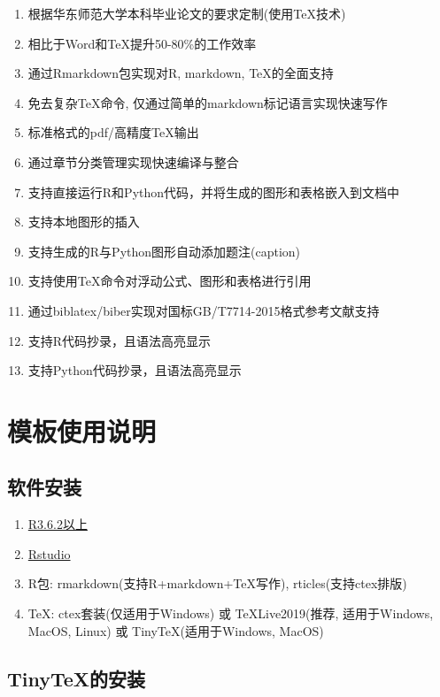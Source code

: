 \documentclass[12pt,a4paper,zihao=-4,UTF8]{book}
\begin{document}
\begin{enumerate}
\def\labelenumi{\arabic{enumi}.}
\item
  根据华东师范大学本科毕业论文的要求定制(使用\TeX 技术)
\item
  相比于Word和\TeX 提升50-80\%的工作效率
\item
  通过Rmarkdown包实现对R, markdown, \TeX 的全面支持
\item
  免去复杂\TeX 命令, 仅通过简单的markdown标记语言实现快速写作
\item
  标准格式的pdf/高精度\TeX 输出
\item
  通过章节分类管理实现快速编译与整合
\item
  支持直接运行R和Python代码，并将生成的图形和表格嵌入到文档中
\item
  支持本地图形的插入
\item
  支持生成的R与Python图形自动添加题注(caption)
\item
  支持使用\TeX 命令对浮动公式、图形和表格进行引用
\item
  通过biblatex/biber实现对国标GB/T7714-2015格式参考文献支持
\item
  支持R代码抄录，且语法高亮显示
\item
  支持Python代码抄录，且语法高亮显示
\end{enumerate}

\section{模板使用说明}

\subsection{软件安装}

\begin{enumerate}
\def\labelenumi{\arabic{enumi}.}
\item
  \href{https://www.r-project.org/}{R3.6.2以上}
\item
  \href{https://rstudio.com/}{Rstudio}
\item
  R包: rmarkdown(支持R+markdown+TeX写作), rticles(支持ctex排版)
\item
  TeX: ctex套装(仅适用于Windows) 或 TeXLive2019(推荐, 适用于Windows,
  MacOS, Linux) 或 TinyTeX(适用于Windows, MacOS)
\end{enumerate}

\subsection{TinyTeX的安装}\label{tinytex}
\end{document}
